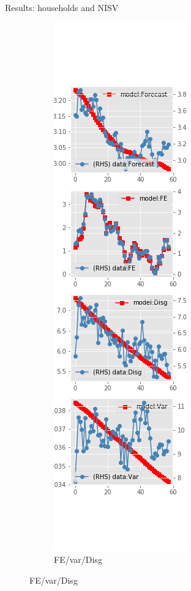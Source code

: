 \documentclass{beamer}
\begin{document}
\begin{frame}{Results: households and NISV}
\begin{figure}[ht]
\begin{subfigure}[b]{0.19\textwidth}
		\end{subfigure}
		\hfill
		\begin{subfigure}[b]{0.19\textwidth}
			\caption{FE/var/Disg}
			\includegraphics[width=\textwidth, height = 0.8\textheight]{figuresDraft/sce_ni_est_sv_diag4.png}
		\end{subfigure}
	\end{figure}
\end{frame}
\end{document}
